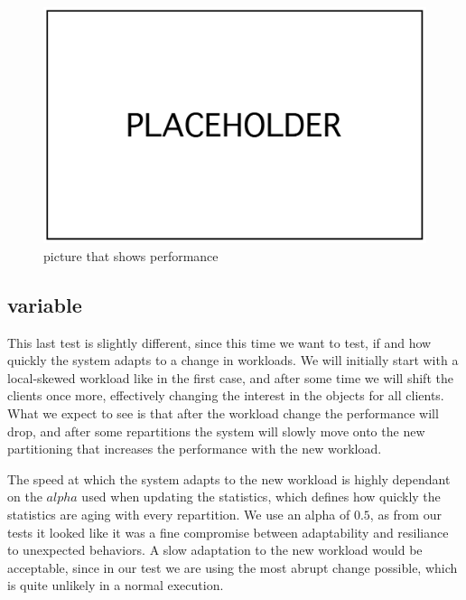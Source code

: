 \begin{figure}[!htb]
  \centering
  \includegraphics[width=\textwidth,height=\textheight,keepaspectratio]{img/placeholder.png}
  \caption[caption]{ picture that shows performance }
  \label{fig:constant-performance}
\end{figure}

\subsection{variable}\label{sec:variable}
This last test is slightly different, since this time we want to test, if and how quickly the system adapts to a change in workloads. We will initially start with a local-skewed workload like in the first case, and after some time we will shift the clients once more, effectively changing the interest in the objects for all clients. What we expect to see is that after the workload change the performance will drop, and after some repartitions the system will slowly move onto the new partitioning that increases the performance with the new workload.

The speed at which the system adapts to the new workload is highly dependant on the $alpha$ used when updating the statistics, which defines how quickly the statistics are aging with every repartition. We use an alpha of $0.5$, as from our tests it looked like it was a fine compromise between adaptability and resiliance to unexpected behaviors. A slow adaptation to the new workload would be acceptable, since in our test we are using the most abrupt change possible, which is quite unlikely in a normal execution.

